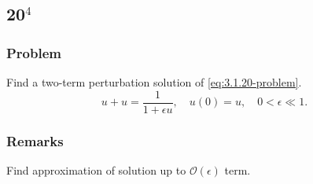\documentclass[12pt,twoside]{article}
\begin{document}
\newpage
\subsection{20$^4$}
\subsubsection*{Problem}
Find a two-term perturbation solution of \cref{eq:3.1.20-problem}.
\begin{equation}
  \label{eq:3.1.20-problem}
  u+u=\frac{1}{1+\epsilon u},\quad u(0)=u,\quad 0<\epsilon\ll1.
\end{equation}

\subsubsection*{Remarks}
Find approximation of solution up to $\mathcal{O}(\epsilon)$ term.
\end{document}

